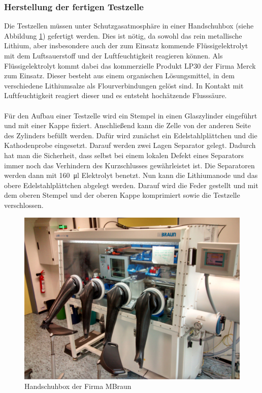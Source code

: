 \documentclass[a4paper, 11pt, headsepline,footsepline,twoside,abstract]{scrbook}
\begin{document}
\subsubsection{Herstellung der fertigen Testzelle}
Die Testzellen müssen unter Schutzgasatmosphäre in einer Handschuhbox (siehe Abbildung \ref{handschuhbox}) gefertigt werden. Dies ist nötig, da sowohl das rein metallische Lithium, aber insbesondere auch der zum Einsatz kommende Flüssigelektrolyt mit dem Luftsauerstoff und der Luftfeuchtigkeit reagieren können. Als Flüssigelektrolyt kommt dabei das kommerzielle Produkt LP30 der Firma Merck zum Einsatz. Dieser besteht aus einem organischen Lösungsmittel, in dem verschiedene Lithiumsalze als Flourverbindungen gelöst sind. In Kontakt mit Luftfeuchtigkeit reagiert dieser und es entsteht hochätzende Flusssäure. 
\\\\
Für den Aufbau einer Testzelle wird ein Stempel in einen Glaszylinder eingeführt und mit einer Kappe fixiert. Anschließend kann die Zelle von der anderen Seite des Zylinders befüllt werden. Dafür wird zunächst ein Edelstahlplättchen und die Kathodenprobe eingesetzt. Darauf werden zwei Lagen Separator gelegt. Dadurch hat man die Sicherheit, dass selbst bei einem lokalen Defekt eines Separators immer noch das Verhindern des Kurzschlusses gewährleistet ist. Die Separatoren werden dann mit \SI{160}{\micro\litre} Elektrolyt benetzt. Nun kann die Lithiumanode und das obere Edelstahlplättchen abgelegt werden. Darauf wird die Feder gestellt und mit dem oberen Stempel und der oberen Kappe komprimiert sowie die Testzelle verschlossen.
\begin{figure}[h]
	\centering
	\includegraphics[width=1.0\columnwidth]{images/handschuhbox.jpg}
	\caption{Handschuhbox der Firma MBraun}
	\label{handschuhbox}
\end{figure}
\end{document}
